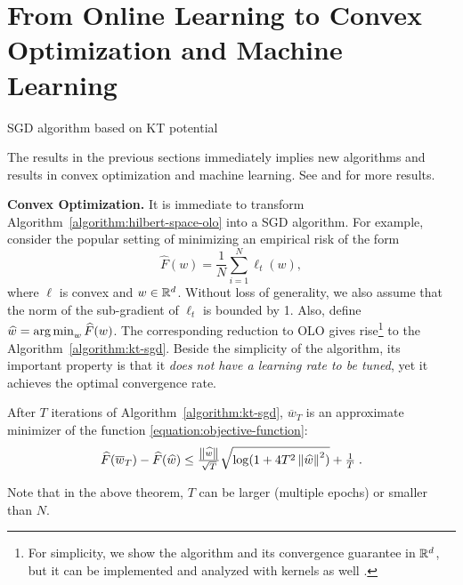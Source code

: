 \section{From Online Learning to Convex Optimization and Machine Learning}
\label{section:applications}

\begin{algorithm}[t]
\caption{SGD algorithm based on KT potential \label{algorithm:kt-sgd}}
\begin{algorithmic}[1]
{
\ENDFOR
{}
}
\end{algorithmic}
\end{algorithm}

The results in the previous sections immediately implies new algorithms and
results in convex optimization and machine learning. See \cite{Orabona-2014} and \cite{Luo-Schapire-2015} for more results.

\textbf{Convex Optimization.} It is immediate to transform
Algorithm~\ref{algorithm:hilbert-space-olo} into a \ac{SGD} algorithm.  For
example, consider the popular setting of minimizing an empirical risk of the
form
\begin{equation}
\label{equation:objective-function}
\widehat{F}(w) = \frac{1}{N} \sum_{i=1}^N \ell_t(w),
\end{equation}
where $\ell$ is convex and $w \in \mathbb{R}^d$. Without loss of generality, we also
assume that the norm of the sub-gradient of $\ell_t$ is bounded by 1. Also,
define $\widehat{w}=  \operatorname*{arg\,min}_w \widehat{F}(w)$.  The corresponding reduction to OLO
gives rise\footnote{For simplicity, we show the algorithm and its convergence
guarantee in $\mathbb{R}^d$, but it can be implemented and analyzed with kernels as well \citep{Orabona-2014}.} to the
Algorithm~\ref{algorithm:kt-sgd}.
Beside the simplicity of the algorithm, its important property is that it
\emph{does not have a learning rate to be tuned}, yet it achieves the optimal
convergence rate.
\begin{theorem}
After $T$ iterations of Algorithm~\ref{algorithm:kt-sgd}, $\overline{w}_T$ is
an approximate minimizer of the function \eqref{equation:objective-function}:
$$
\widehat{F}(\overline{w}_T) - \widehat{F}(\widehat{w}) \leq \tfrac{\left\|{\widehat{w}}\right\|}{\sqrt{T}} \sqrt{\log(1+4 T^2 \left\|{\widehat{w}}\right\|^2)} +\tfrac{1}{T} \; .
$$
\end{theorem}
Note that in the above theorem, $T$ can be larger (multiple epochs) or smaller
than $N$.

